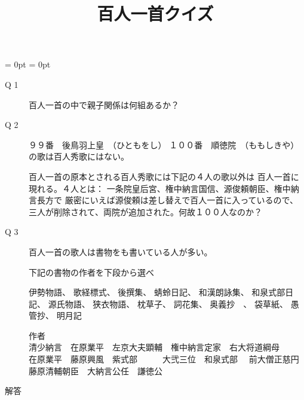 \documentclass[fleqn]{article}
\begin{document}
\title{百人一首クイズ　}
\maketitle
\hoffset = 0pt
\voffset = 0pt
\topmargin=0pt
\textheight=21cm
\headheight=0pt
\headsep=0pt
\newcommand{\CHo}{\makebox(0,0){$\bullet$}}
\newcommand{\CHc}{\makebox(0,0){$\circ$}}
\newcommand{\CHb}{\makebox(0,0){$\bigcirc$}}


\renewcommand{\descriptionlabel}[1]
{\hspace{\labelsep}\textsf{#1}}
\begin{description}
\item[Q 1]{百人一首の中で親子関係は何組あるか？

}
\item[Q 2]{
９９番　後鳥羽上皇　（ひともをし）
１００番　順徳院　（ももしきや）の歌は百人秀歌にはない。

百人一首の原本とされる百人秀歌には下記の４人の歌以外は
百人一首に現れる。４人とは：
一条院皇后宮、権中納言国信、源俊頼朝臣、権中納言長方で
厳密にいえば源俊頼は差し替えで百人一首に入っているので、
三人が削除されて、両院が追加された。何故１００人なのか？

}

\item[Q 3]{
百人一首の歌人は書物をも書いている人が多い。
 
下記の書物の作者を下段から選べ
 
伊勢物語、
歌経標式、
後撰集、
蜻蛉日記、
和漢朗詠集、
和泉式部日記、
源氏物語、
狭衣物語、
枕草子、
詞花集、
奥義抄　、
袋草紙、
愚管抄、
明月記

作者\\
 清少納言　在原業平　左京大夫顕輔　権中納言定家　右大将道綱母　　
在原業平　藤原興風　紫式部　　　大弐三位　和泉式部　
前大僧正慈円　藤原清輔朝臣　大納言公任　謙徳公

}
\end{description}
\newpage
{\Large 解答}
\end{document}

